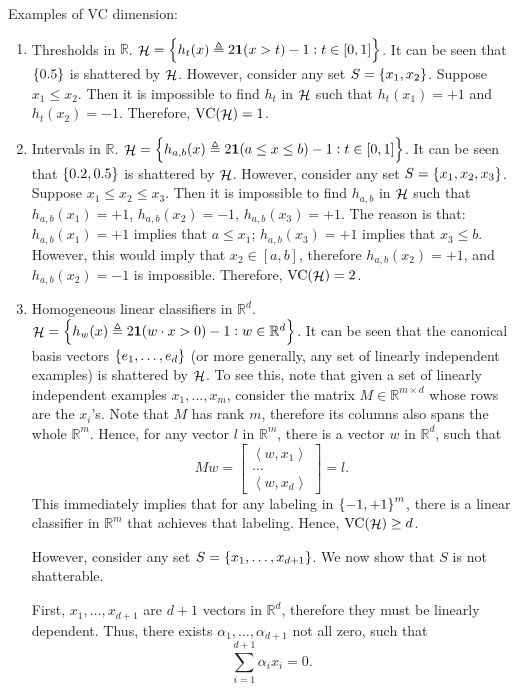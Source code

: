 \documentclass{article}
\DeclareMathOperator*{\Hcal}{{\cal H}}
\DeclareMathOperator*{\VC}{{\rm VC}}
\newcommand{\RR}{\mathbb{R}} %
\newcommand{\defeq}{\triangleq}
\newcommand*{\one}{{\bf 1}}
\newcommand{\inner}[2]{\left\langle #1,#2 \right\rangle}
\begin{document}
Examples of VC dimension:
\begin{enumerate}
\item Thresholds in $\RR$. $\Hcal = \cbr{h_t(x) \defeq 2 \one(x > t)-1:  t \in [0,1]}$. It can be seen that $\cbr{0.5}$ is shattered by $\Hcal$. However, consider any set $S = \cbr{x_1, x_2}$. Suppose $x_1 \leq x_2$. Then it is impossible to find $h_t$ in $\Hcal$ such that
$h_t(x_1) = +1$ and $h_t(x_2) = -1$. Therefore, $\VC(\Hcal) = 1$.

\item Intervals in $\RR$. $\Hcal = \cbr{h_{a,b}(x) \defeq 2\one(a \leq x \leq b) - 1:  t \in [0,1]}$. It can be seen that $\cbr{0.2, 0.5}$ is shattered by $\Hcal$. However, consider any set $S = \cbr{x_1, x_2, x_3}$. Suppose $x_1 \leq x_2 \leq x_3$. Then it is impossible to find $h_{a,b}$ in $\Hcal$ such that
$h_{a,b}(x_1) = +1$, $h_{a,b}(x_2) = -1$, $h_{a,b}(x_3) = +1$. The reason is that: $h_{a,b}(x_1) = +1$ implies that $a \leq x_1$; $h_{a,b}(x_3) = +1$ implies that $x_3 \leq b$. However, this would imply that $x_2 \in [a,b]$, therefore $h_{a,b}(x_2) = +1$,
and $h_{a,b}(x_2) = -1$ is impossible.
Therefore, $\VC(\Hcal) = 2$.

\item Homogeneous linear classifiers in $\RR^d$. $\Hcal = \cbr{h_w(x) \defeq 2\one(w \cdot x > 0) - 1: w \in \RR^d}$. It can be seen that the canonical basis vectors $\cbr{e_1, \ldots, e_d}$ (or more generally, any set of linearly independent examples) is shattered by $\Hcal$. To see this, note that given a set of linearly independent examples $x_1, \ldots, x_m$, consider the matrix
$M \in \RR^{m \times d}$ whose rows are the $x_i$'s. Note that $M$ has rank $m$, therefore its columns also spans the whole $\RR^m$. Hence, for any vector $l$ in $\RR^m$, there is a vector $w$ in
$\RR^d$, such that
\[ M w = \begin{bmatrix} \inner{w}{x_1} \\ \ldots \\ \inner{w}{x_d} \end{bmatrix} = l. \]
This immediately implies that for any labeling in $\cbr{-1,+1}^m$, there is a linear classifier in $\RR^m$ that achieves that labeling. Hence, $\VC(\Hcal) \geq d$.

However, consider any set $S = \cbr{x_1, \ldots, x_{d+1}}$. We now show that $S$ is not shatterable.

First, $x_1, \ldots, x_{d+1}$ are $d+1$ vectors in $\RR^d$, therefore they must be linearly dependent. Thus, there exists $\alpha_1, \ldots, \alpha_{d+1}$ not all zero, such that
\begin{equation}
  \sum_{i=1}^{d+1} \alpha_i x_i = 0.
  \label{eqn:lc}
\end{equation}


\end{enumerate}
\end{document}
